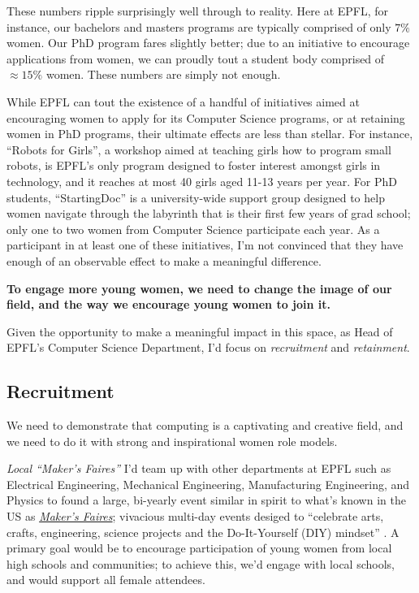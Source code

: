 \documentclass[acmtocl]{acmtrans2m}
\begin{document}
These numbers ripple surprisingly well through to reality. Here at EPFL, for
instance, our bachelors and masters programs are typically comprised of only
\href{http://www.swissict.ch/fileadmin/award/Impressionen/Symposium/WillyZwaenepoel\_ICT-Akademie.pdf}{$7\%$}~\cite{Willy}
women. Our PhD program fares slightly better; due to an initiative to
encourage applications from women, we can proudly tout a student body
comprised of $\approx15\%$ women. These numbers are simply not enough.

While EPFL can tout the existence of a handful of initiatives aimed at
encouraging women to apply for its Computer Science programs, or at retaining
women in PhD programs, their ultimate effects are less than stellar. For
instance, ``Robots for Girls'', a workshop aimed at teaching girls how to
program small robots, is EPFL's only program designed to foster interest
amongst girls in technology,
and it reaches at most 40 girls aged 11-13 years per year.
For PhD students, ``StartingDoc'' is a university-wide support group designed
to help women navigate through the labyrinth that is their first few years of
grad school; only one to two women from Computer Science participate each year.
As a participant in at least one of these initiatives, I'm not convinced that
they have enough of an observable effect to make a meaningful difference.


\textbf{To engage more young women, we need to change the image of our field,
and the way we encourage young women to join it.}

Given the opportunity to make a meaningful impact in this space, as Head
of EPFL's Computer Science Department, I'd focus on \textit{recruitment} and
\textit{retainment}.

\subsection*{\textbf{Recruitment}}
\vspace{-0.1in}
We need to demonstrate that computing is a captivating and creative field, and
we need to do it with strong and inspirational women role models.

\textit{\textsf{Local ``Maker's Faires''}}\newline
I'd team up with other departments at EPFL such as Electrical Engineering,
Mechanical Engineering, Manufacturing Engineering, and Physics to found a
large, {bi-yearly} event similar in spirit to what's known in the US as
\href{http://news.cnet.com/8301-13772_3-9935358-52.html}{\textit{Maker's
Faires}}; vivacious multi-day events desiged to ``celebrate arts, crafts,
engineering, science projects and the Do-It-Yourself (DIY) mindset''
\cite{MakerFaire}. A primary goal would be to encourage participation of
young women from local high schools and communities; to achieve this, we'd
engage with local schools, and would support all female attendees.
\end{document}
